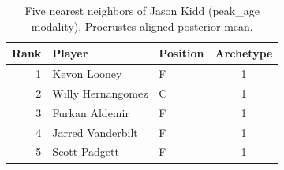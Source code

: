 \begin{table}[htbp]
  \centering\small
  \begin{tabular}{rllc}
    \toprule
    Rank & Player & Position & Archetype \\
    \midrule
    1 & Kevon Looney & F & 1 \\
    2 & Willy Hernangomez & C & 1 \\
    3 & Furkan Aldemir & F & 1 \\
    4 & Jarred Vanderbilt & F & 1 \\
    5 & Scott Padgett & F & 1 \\
    \bottomrule
  \end{tabular}
  \caption{Five nearest neighbors of Jason Kidd (peak_age modality), Procrustes-aligned posterior mean.}
  \label{tab:Jason_Kidd_neighbors_peak_age}
\end{table}

